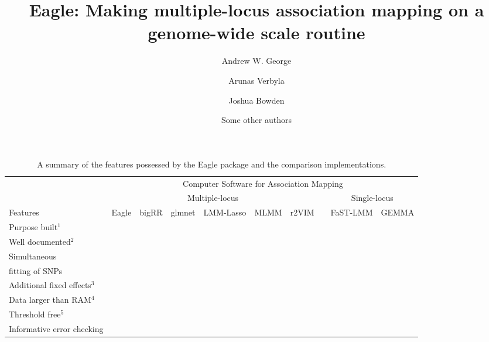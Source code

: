 \documentclass{article}
\newcommand{\cmark}{\ding{51}}%
\newcommand{\xmark}{\ding{55}}%
\begin{document}
\title{Eagle: Making multiple-locus association mapping on a genome-wide scale routine}
\author[1]{Andrew W. George}
\author[1]{Arunas Verbyla}
\author[2]{Joshua Bowden}
\author[1]{Some other authors}


\maketitle






\begin{table}
\caption{A summary of the features possessed by the Eagle package and the comparison implementations.}
\label{suptabsummary}

\begin{tabular}{lccccccccc}
                                &  \multicolumn{9}{c}{Computer Software for Association Mapping} \\ \cline{2-10}
                                 & \multicolumn{6}{c}{Multiple-locus}  & & \multicolumn{2}{c}{Single-locus} \\  \cline{2-7}   \cline{9-10}
 Features                 & Eagle  & bigRR & glmnet & LMM-Lasso & MLMM & r2VIM     & & FaST-LMM & GEMMA \\  \hline
Purpose built$^1$    &   \cmark     &    \cmark      &  \xmark   &  \cmark  &  \cmark  &  \cmark && \cmark & \cmark           \\ [0.2cm]
Well documented$^2$           & \cmark &   \xmark   & \cmark   & \xmark     &   \cmark     & \xmark          && \cmark    &    \cmark    \\  [0.2cm]
Simultaneous   &    \cmark     &    \cmark        &   \cmark          &      \cmark             &  \xmark          &  \xmark              &&   \xmark   &  \xmark     \\  
fitting of SNPs     &         &            &             &                   &            &                &&      &      \\  [0.2cm]
Additional fixed effects$^3$          &   \cmark   &      \cmark      &     \cmark    &  \xmark                 &      \cmark      &      \cmark          &&      \cmark & \cmark     \\   [0.2cm]
Data larger than RAM$^4$                   &   \cmark    &      \xmark      & \xmark          &  \xmark    &  \xmark    &   \xmark     && \cmark      & \xmark    \\  [0.2cm]
Threshold free$^5$        &    \cmark     &  \xmark    &  \xmark         &    \xmark               &     \cmark       &  \xmark              &&  \xmark   & \xmark      \\  [0.2cm]
Informative error checking           &  \cmark      &     \xmark        &      \xmark     &           \xmark        &      \xmark       &         \xmark       && \cmark  & \xmark \\ \hline


\end{tabular}
\end{table}
\end{document}
